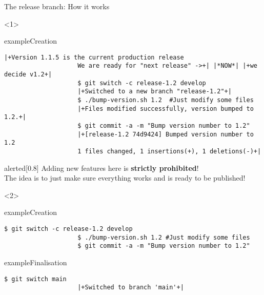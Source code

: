 \documentclass[usenames,svgnames,14pt]{beamer}
\begin{document}
\begin{frame}[fragile,c]{The release branch: How it works}
    \begin{overlayarea}{\textwidth}{0.9\textheight}
        \vspace{-5mm}
        \begin{onlyenv}<1>
            \begin{varblock}{example}{Creation}
                \begin{lstlisting}[style=MyBash]
                    |+Version 1.1.5 is the current production release
                    We are ready for "next release" ->+| |*NOW*| |+we decide v1.2+|
                    $ git switch -c release-1.2 develop
                    |+Switched to a new branch "release-1.2"+|
                    $ ./bump-version.sh 1.2  #Just modify some files
                    |+Files modified successfully, version bumped to 1.2.+|
                    $ git commit -a -m "Bump version number to 1.2"
                    |+[release-1.2 74d9424] Bumped version number to 1.2
                    1 files changed, 1 insertions(+), 1 deletions(-)+|
                \end{lstlisting}
            \end{varblock}
            \begin{varblock}{alerted}[0.8\textwidth]{}
                \alert{Adding new features here is \textbf{strictly prohibited}!}\\
                The idea is to just make sure everything works and is ready to be published!
            \end{varblock}
        \end{onlyenv}
        \begin{onlyenv}<2>
            \begin{varblock}{example}{Creation}
                \begin{lstlisting}[style=MyBash]
                    $ git switch -c release-1.2 develop
                    $ ./bump-version.sh 1.2 #Just modify some files
                    $ git commit -a -m "Bump version number to 1.2"
                \end{lstlisting}
            \end{varblock}
            \vspace{-2mm}
            \begin{varblock}{example}{Finalisation}
                \begin{lstlisting}[style=MyBash]
                    $ git switch main
                    |+Switched to branch 'main'+|

\end{lstlisting}
\end{varblock}
\end{onlyenv}
\end{overlayarea}
\end{frame}
\end{document}
